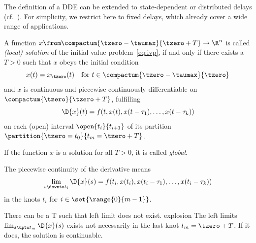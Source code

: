     The definition of a DDE can be extended to state-dependent or distributed delays (cf.~\cite{}). For simplicity, we restrict here to fixed delays, which already cover a wide range of applications.



    \begin{definition}\label{def:solution-dde}
        A function $x\from\compactum{\tzero-\taumax}{\tzero+T}\to\R^n$ is called \emph{(local) solution} of the initial value problem~\eqref{eq:ivp}, if and only if there exists a $T>0$ such that
        $x$ obeys the initial condition
        \begin{equation*}
            x(t) = x_{\tzero}(t) \quad\text{for } t\in\compactum{\tzero-\taumax}{\tzero}
        \end{equation*}
        and $x$ is continuous and piecewise continuously differentiable on $\compactum{\tzero}{\tzero+T}$, fulfilling
        \begin{equation*}
            \D{x}(t) = f(t,x(t),x(t-\tau_1),\ldots,x(t-\tau_k))
        \end{equation*}
        on each (open) interval $\open{t_i}{t_{i+1}}$ of its partition $\partition{\tzero=t_0}{t_m=\tzero+T}$.
        
        If the function $x$ is a solution for all $T>0$, it is called \emph{global}.   
    \end{definition}
    
    The piecewise continuity of the derivative means
    \begin{equation*}
        \lim_{s\downto t_i}\D{x}(s) = f(t_i,x(t_i),x(t_i-\tau_1),\ldots,x(t_i-\tau_k))
    \end{equation*}
    in the knots $t_i$ for $i\in\set{\range{0}{m-1}}$.


    There can be a T such that left limit does not exist. explosion
    The left limits $\lim_{s\upto t_m}\D{x}(s)$ exists not necessarily in the last knot $t_m=\tzero+T$. If it does, the solution is continuable.


